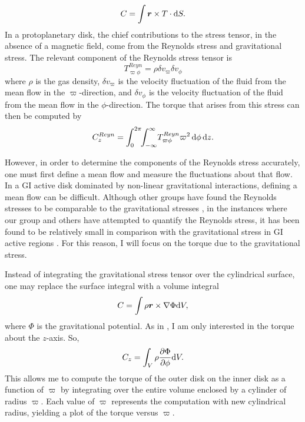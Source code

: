 \begin{equation}
C = \int \boldsymbol{r} \times T \cdot \mathrm{d} S.
\end{equation}
In a protoplanetary disk, the chief contributions to the stress tensor, in the absence of a magnetic field, come from the Reynolds stress and gravitational stress. The relevant component of the Reynolds stress tensor is
\begin{equation}
T^{Reyn}_{\varpi\phi} = \rho \delta v_{\varpi} \delta v_{\phi}
\end{equation}
where $\rho$ is the gas density, $\delta v_{\varpi}$ is the velocity fluctuation of the fluid from the mean flow in the $\varpi$-direction, and $\delta v_{\phi}$ is the velocity fluctuation of the fluid from the mean flow in the $\phi$-direction. The torque that arises from this stress can then be computed by
\begin{equation}
C^{Reyn}_z = \int_0^{2\pi}\!\!\int_{-\infty}^{\infty}\!T^{Reyn}_{\varpi\phi} \varpi^2 \,\mathrm{d} \phi \,\mathrm{d} z.
\end{equation}

However, in order to determine the components of the Reynolds stress accurately, one must first define a mean flow and measure the fluctuations about that flow. In a GI active disk dominated by non-linear gravitational interactions, defining a mean flow can be difficult. Although other groups have found the Reynolds stresses to be comparable to the gravitational stresses \citep{gammie2001}, in the instances where our group and others have attempted to quantify the Reynolds stress, it has been found to be relatively small in comparison with the gravitational stress in GI active regions \citep{lodato2004,boley2006,boleyphd2007}. For this reason, I will focus on the torque due to the gravitational stress. 

Instead of integrating the gravitational stress tensor over the cylindrical surface, one may replace the surface integral with a volume integral
\begin{equation}
C=\int \rho \boldsymbol{r}\times \nabla\Phi \mathrm{d} V,
\end{equation}
where $\Phi$ is the gravitational potential. As in \citet{boley2006}, I am only interested in the torque about the $z$-axis. So,
\begin{equation}
C_{z} = \int_V \rho\frac{\partial\Phi}{\partial\phi} \mathrm{d} V.
\label{eq:IC:gravtorquez}
\end{equation}
This allows me to compute the torque of the outer disk on the inner disk as a function of $\varpi$ by integrating over the entire volume enclosed by a cylinder of radius $\varpi$. Each value of $\varpi$ represents the computation with new cylindrical radius, yielding a plot of the torque versus $\varpi$.

